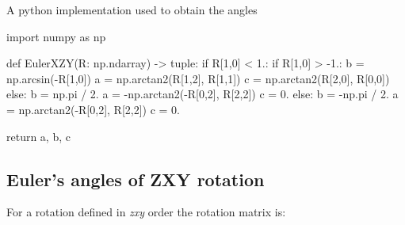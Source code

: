     A python implementation used to obtain the angles

\begin{python}
import numpy as np

def EulerXZY(R: np.ndarray) -> tuple:
    if R[1,0] < 1.:
        if R[1,0] > -1.:
            b = np.arcsin(-R[1,0])
            a = np.arctan2(R[1,2], R[1,1])
            c = np.arctan2(R[2,0], R[0,0])
        else:
            b = np.pi / 2.
            a = -np.arctan2(-R[0,2], R[2,2])
            c = 0.
    else:
        b = -np.pi / 2.
        a = np.arctan2(-R[0,2], R[2,2])
        c = 0.

    return a, b, c
\end{python}


\subsection{Euler's angles of \textbf{ZXY} rotation}

    For a rotation defined in \textit{zxy} order the rotation matrix is:


